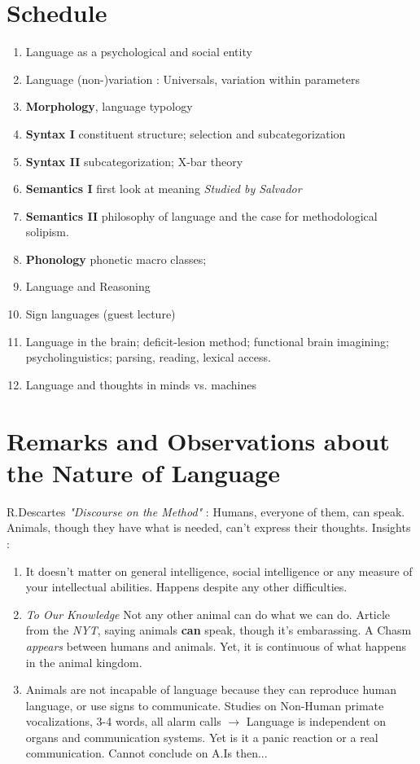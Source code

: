 \documentclass{cours}
\begin{document}
\section*{Schedule}
\begin{enumerate}
    \item Language as a psychological and social entity
    \item Language (non-)variation : Universals, variation within parameters
    \item \textbf{Morphology}, language typology
    \item \textbf{Syntax I} constituent structure; selection and subcategorization
    \item \textbf{Syntax II} subcategorization; X-bar theory
    \item \textbf{Semantics I} first look at meaning \textsl{Studied by Salvador}
    \item \textbf{Semantics II} philosophy of language and the case for methodological solipism.
    \item \textbf{Phonology} phonetic macro classes;
    \item Language and Reasoning
    \item Sign languages (guest lecture)
    \item Language in the brain; deficit-lesion method; functional brain imagining; psycholinguistics; parsing, reading, lexical access.
    \item Language and thoughts in minds vs. machines
\end{enumerate}

\section{Remarks and Observations about the Nature of Language}
R.Descartes \textit{"Discourse on the Method"} : Humans, everyone of them, can speak. Animals, though they have what is needed, can't express their thoughts.
Insights :
\begin{enumerate}
    \item It doesn't matter on general intelligence, social intelligence or any measure of your intellectual abilities. Happens despite any other difficulties.
    \item \emph{To Our Knowledge} Not any other animal can do what we can do. Article from the \textit{NYT}, saying animals \textbf{can} speak, though it's embarassing. A Chasm \textit{appears} between humans and animals. Yet, it is continuous of what happens in the animal kingdom.
    \item Animals are not incapable of language because they can reproduce human language, or use signs to communicate. Studies on Non-Human primate vocalizations, 3-4 words, all alarm calls $\rightarrow$ Language is independent on organs and communication systems. Yet is it a panic reaction or a real communication. Cannot conclude on A.Is then...
\end{enumerate}
\end{document}
